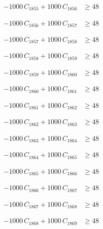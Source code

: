\documentclass[a4paper,11pt]{article}
\begin{document}
\begin{align}
-1000\,C_{1855} + 1000\,C_{1856} &\geq 48 \nonumber
\end{align}

\begin{align}
-1000\,C_{1856} + 1000\,C_{1857} &\geq 48 \nonumber
\end{align}

\begin{align}
-1000\,C_{1857} + 1000\,C_{1858} &\geq 48 \nonumber
\end{align}

\begin{align}
-1000\,C_{1858} + 1000\,C_{1859} &\geq 48 \nonumber
\end{align}

\begin{align}
-1000\,C_{1859} + 1000\,C_{1860} &\geq 48 \nonumber
\end{align}

\begin{align}
-1000\,C_{1860} + 1000\,C_{1861} &\geq 48 \nonumber
\end{align}

\begin{align}
-1000\,C_{1861} + 1000\,C_{1862} &\geq 48 \nonumber
\end{align}

\begin{align}
-1000\,C_{1862} + 1000\,C_{1863} &\geq 48 \nonumber
\end{align}

\begin{align}
-1000\,C_{1863} + 1000\,C_{1864} &\geq 48 \nonumber
\end{align}

\begin{align}
-1000\,C_{1864} + 1000\,C_{1865} &\geq 48 \nonumber
\end{align}

\begin{align}
-1000\,C_{1865} + 1000\,C_{1866} &\geq 48 \nonumber
\end{align}

\begin{align}
-1000\,C_{1866} + 1000\,C_{1867} &\geq 48 \nonumber
\end{align}

\begin{align}
-1000\,C_{1867} + 1000\,C_{1868} &\geq 48 \nonumber
\end{align}

\begin{align}
-1000\,C_{1868} + 1000\,C_{1869} &\geq 48 \nonumber
\end{align}
\end{document}
